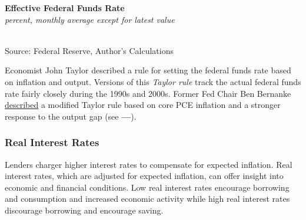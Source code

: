 \documentclass{report}
\makeatletter
\newcommand{\tbllink}[1]{\href{https://raw.githubusercontent.com/bdecon/US-chartbook/master/chartbook/data/#1}{\faTable}}
\newcommand*\short[1]{\expandafter\@gobbletwo\number\numexpr#1\relax}
\newcommand{\absnode}[3]{\node[below right, align=left] at (axis cs: #1,#2) {#3};}
\newcommand{\dateaxisticks}{
		date coordinates in=x, axis line style={draw=none},
		xmax={2022-10-31},
		max space between ticks=40,	    
		xtick={{1990-01-01}, {1992-01-01}, {1994-01-01}, 
			{1996-01-01}, {1998-01-01}, {2000-01-01}, 
			{2002-01-01}, {2004-01-01}, {2006-01-01},
			{2008-01-01}, {2010-01-01}, {2012-01-01}, {2014-01-01},
		    {2016-01-01}, {2018-01-01}, {2020-01-01}, {2022-01-01}, 
		    {2024-01-01}, {2026-01-01}},
		minor xtick={{1989-01-01}, {1991-01-01}, {1993-01-01},
			{1995-01-01}, {1997-01-01}, {1999-01-01}, 
			{2001-01-01}, {2003-01-01}, {2005-01-01}, {2007-01-01},
		    {2009-01-01}, {2011-01-01}, {2013-01-01}, {2015-01-01},
		    {2017-01-01}, {2019-01-01}, {2021-01-01}, {2023-01-01}, 
		    {2025-01-01}, {2027-01-01}},
		enlarge y limits={0.06}, enlarge x limits={0.01},
		}
\newcommand{\bbar}[2]{extra #1 ticks = {{#2}}, extra #1 tick labels = ,
		extra #1 tick style = {grid=major, grid style={thick, black!25}},}
\newcommand{\stdline}[4]{\addplot[very thick, no markers, color=#1] 
		table [x=#2, y=#3, col sep=comma] {#4};	}
\newcommand{\thickline}[4]{\addplot[ultra thick, no markers, color=#1] 
		table [x=#2, y=#3, col sep=comma] {#4};	}
\newcommand{\rbars}{
		\fill[color=black!10] (axis cs:{1990-07-01},\pgfkeysvalueof{/pgfplots/ymin}) rectangle 
			(axis cs:{1991-03-01}, \pgfkeysvalueof{/pgfplots/ymax});
		\fill[color=black!10] (axis cs:{2007-12-01},\pgfkeysvalueof{/pgfplots/ymin}) rectangle 
			(axis cs:{2009-07-01}, \pgfkeysvalueof{/pgfplots/ymax});
		\fill[color=black!10] (axis cs:{2001-03-01},\pgfkeysvalueof{/pgfplots/ymin}) rectangle 
			(axis cs:{2001-11-01}, \pgfkeysvalueof{/pgfplots/ymax});
		\fill[color=black!10] (axis cs:{2020-02-01},\pgfkeysvalueof{/pgfplots/ymin}) rectangle 
			(axis cs:{2020-05-01}, \pgfkeysvalueof{/pgfplots/ymax});}
\makeatother
\begin{document}
{\begin{minipage}{0.76\textwidth}
\normalsize \textbf{Effective Federal Funds Rate}\\
\footnotesize{\textit{percent, monthly average except for latest value }}\\
\hspace*{-2mm} \\
\footnotesize{Source: Federal Reserve, Author's Calculations} \hfill \tbllink{rates.csv}
\vspace{2mm}

\small Economist John Taylor described a rule for setting the federal funds rate based on inflation and output. Versions of this \textit{Taylor rule} track the actual federal funds rate fairly closely during the 1990s and 2000s. Former Fed Chair Ben Bernanke \href{https://www.brookings.edu/blog/ben-bernanke/2015/04/28/the-taylor-rule-a-benchmark-for-monetary-policy/}{described} a modified Taylor rule based on core PCE inflation and a stronger response to the output gap (see {\color{cyan!80!white}\textbf{---}}). 
\end{minipage}
\newpage
\begin{minipage}{0.76\textwidth}
\subsubsection*{Real Interest Rates}
\small Lenders charger higher interest rates to compensate for expected inflation. Real interest rates, which are adjusted for expected inflation, can offer insight into economic and financial conditions. Low real interest rates encourage borrowing and consumption and increased economic activity while high real interest rates discourage borrowing and encourage saving. 


\end{minipage}}
\end{document}
